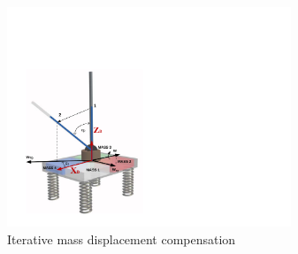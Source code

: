 \begin{figure}
	\centering
	\includegraphics[width=85mm]{./pictures/IterativeAlgorithm.pdf}
	\caption{Iterative mass displacement compensation}
	\label{fig:imassCom}
\end{figure}
